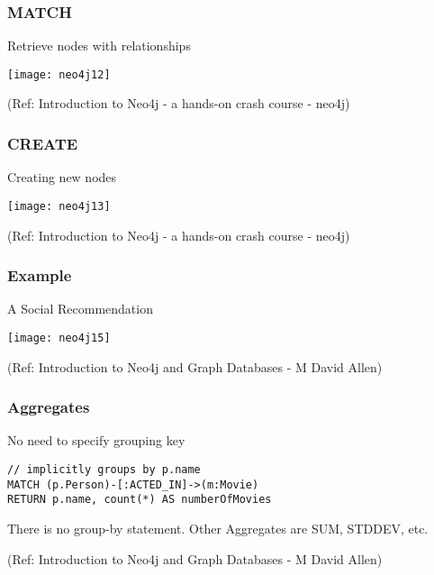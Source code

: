 \begin{frame}[fragile]\frametitle{MATCH}

Retrieve nodes with relationships

\begin{center}
\texttt{[image: neo4j12]}
\end{center}	  


{\tiny (Ref: Introduction to Neo4j - a hands-on crash course  - neo4j)}

\end{frame}

\begin{frame}[fragile]\frametitle{CREATE}

 Creating new nodes
 

\begin{center}
\texttt{[image: neo4j13]}
\end{center}	  


{\tiny (Ref: Introduction to Neo4j - a hands-on crash course  - neo4j)}

\end{frame}

\begin{frame}[fragile]\frametitle{Example}
A Social Recommendation

\begin{center}
\texttt{[image: neo4j15]}
\end{center}	  


{\tiny (Ref: Introduction to Neo4j and Graph Databases
 - M David Allen)}

\end{frame}

\begin{frame}[fragile]\frametitle{Aggregates}
No need to specify grouping key

\begin{lstlisting}
// implicitly groups by p.name
MATCH (p.Person)-[:ACTED_IN]->(m:Movie)
RETURN p.name, count(*) AS numberOfMovies
\end{lstlisting}	  

There is no group-by statement. Other Aggregates are SUM, STDDEV, etc.

{\tiny (Ref: Introduction to Neo4j and Graph Databases
 - M David Allen)}

\end{frame}

